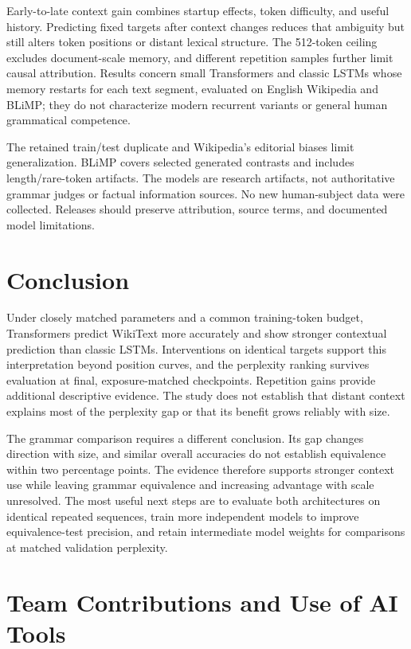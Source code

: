 \documentclass[10pt]{article}
\begin{document}
Early-to-late context gain combines startup effects, token difficulty, and useful history. Predicting fixed targets after context changes reduces that ambiguity but still alters token positions or distant lexical structure. The 512-token ceiling excludes document-scale memory, and different repetition samples further limit causal attribution. Results concern small Transformers and classic LSTMs whose memory restarts for each text segment, evaluated on English Wikipedia and BLiMP; they do not characterize modern recurrent variants or general human grammatical competence.

The retained train/test duplicate and Wikipedia's editorial biases limit generalization. BLiMP covers selected generated contrasts and includes length/rare-token artifacts. The models are research artifacts, not authoritative grammar judges or factual information sources. No new human-subject data were collected. Releases should preserve attribution, source terms, and documented model limitations.

\section{Conclusion}

Under closely matched parameters and a common training-token budget, Transformers predict WikiText more accurately and show stronger contextual prediction than classic LSTMs. Interventions on identical targets support this interpretation beyond position curves, and the perplexity ranking survives evaluation at final, exposure-matched checkpoints. Repetition gains provide additional descriptive evidence. The study does not establish that distant context explains most of the perplexity gap or that its benefit grows reliably with size.

The grammar comparison requires a different conclusion. Its gap changes direction with size, and similar overall accuracies do not establish equivalence within two percentage points. The evidence therefore supports stronger context use while leaving grammar equivalence and increasing advantage with scale unresolved. The most useful next steps are to evaluate both architectures on identical repeated sequences, train more independent models to improve equivalence-test precision, and retain intermediate model weights for comparisons at matched validation perplexity.

\section*{Team Contributions and Use of AI Tools}
\end{document}
